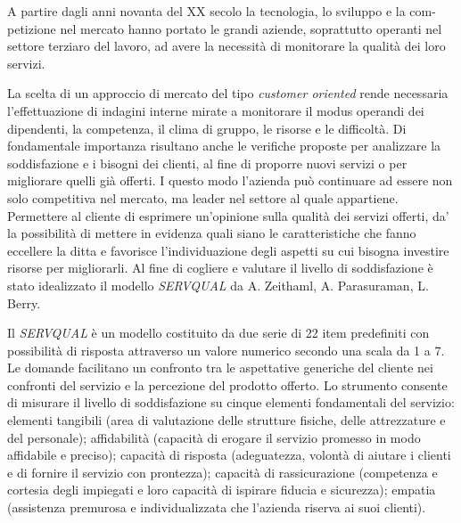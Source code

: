 A partire dagli anni novanta del XX secolo la tecnologia, lo sviluppo e la com-
petizione nel mercato hanno portato le grandi aziende, soprattutto operanti nel
settore terziaro del lavoro, ad avere la necessità di monitorare la qualità dei
loro servizi.

La scelta di un approccio di mercato del tipo \emph{customer oriented} rende
necessaria l'effettuazione di indagini interne mirate a monitorare il modus
operandi dei dipendenti, la competenza, il clima di gruppo, le risorse e le
difficoltà. Di fondamentale importanza risultano anche le verifiche proposte per
analizzare la soddisfazione e i bisogni dei clienti, al fine di proporre nuovi
servizi o per migliorare quelli già offerti. I questo modo l'azienda può
continuare ad essere non solo competitiva nel mercato, ma leader nel settore al
quale appartiene.
Permettere al cliente di esprimere un'opinione sulla qualità dei servizi
offerti, da' la possibilità di mettere in evidenza quali siano le
caratteristiche che fanno eccellere la ditta e favorisce l'individuazione degli
aspetti su cui bisogna investire risorse per migliorarli.
Al fine di cogliere e valutare il livello di soddisfazione è stato idealizzato
il modello \emph{SERVQUAL} da A. Zeithaml, A. Parasuraman, L. Berry. 

Il \emph{SERVQUAL} è un
modello costituito da due serie di 22 item predefiniti con possibilità di
risposta attraverso un valore numerico secondo una scala da 1 a 7. Le domande
facilitano un confronto tra le aspettative generiche del cliente nei confronti
del servizio e la percezione del prodotto offerto.
Lo strumento consente di misurare il livello di soddisfazione su cinque elementi
fondamentali del servizio: elementi tangibili  (area di valutazione delle
strutture fisiche, delle attrezzature e del personale); affidabilità (capacità
di erogare il servizio promesso in modo affidabile e preciso); capacità di
risposta (adeguatezza, volontà di aiutare i clienti e di fornire il servizio con
prontezza); capacità di rassicurazione (competenza e cortesia degli impiegati e
loro capacità di ispirare fiducia e sicurezza); empatia (assistenza premurosa e
individualizzata che l’azienda riserva ai suoi clienti).

